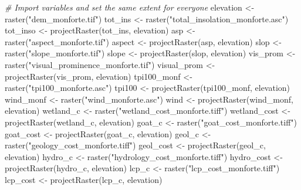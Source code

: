 \documentclass[
]{article}
\newenvironment{Shaded}{\begin{snugshade}}{\end{snugshade}}
\newcommand{\CommentTok}[1]{\textcolor[rgb]{0.56,0.35,0.01}{\textit{#1}}}
\newcommand{\FunctionTok}[1]{\textcolor[rgb]{0.00,0.00,0.00}{#1}}
\newcommand{\NormalTok}[1]{#1}
\newcommand{\OtherTok}[1]{\textcolor[rgb]{0.56,0.35,0.01}{#1}}
\newcommand{\StringTok}[1]{\textcolor[rgb]{0.31,0.60,0.02}{#1}}
\begin{document}
\begin{Shaded}
\begin{Highlighting}[]
\CommentTok{\# Import variables and set the same extent for everyone}
\NormalTok{elevation }\OtherTok{\textless{}{-}} \FunctionTok{raster}\NormalTok{(}\StringTok{"dem\_monforte.tif"}\NormalTok{)}
\NormalTok{tot\_ins }\OtherTok{\textless{}{-}} \FunctionTok{raster}\NormalTok{(}\StringTok{"total\_insolation\_monforte.asc"}\NormalTok{)}
\NormalTok{tot\_inso }\OtherTok{\textless{}{-}} \FunctionTok{projectRaster}\NormalTok{(tot\_ins, elevation)}
\NormalTok{asp }\OtherTok{\textless{}{-}} \FunctionTok{raster}\NormalTok{(}\StringTok{"aspect\_monforte.tif"}\NormalTok{)}
\NormalTok{aspect }\OtherTok{\textless{}{-}} \FunctionTok{projectRaster}\NormalTok{(asp, elevation)}
\NormalTok{slop }\OtherTok{\textless{}{-}} \FunctionTok{raster}\NormalTok{(}\StringTok{"slope\_monforte.tif"}\NormalTok{)}
\NormalTok{slope }\OtherTok{\textless{}{-}} \FunctionTok{projectRaster}\NormalTok{(slop, elevation)}
\NormalTok{vis\_prom }\OtherTok{\textless{}{-}} \FunctionTok{raster}\NormalTok{(}\StringTok{"visual\_prominence\_monforte.tif"}\NormalTok{)}
\NormalTok{visual\_prom }\OtherTok{\textless{}{-}} \FunctionTok{projectRaster}\NormalTok{(vis\_prom, elevation)}
\NormalTok{tpi100\_monf }\OtherTok{\textless{}{-}} \FunctionTok{raster}\NormalTok{(}\StringTok{"tpi100\_monforte.asc"}\NormalTok{)}
\NormalTok{tpi100 }\OtherTok{\textless{}{-}} \FunctionTok{projectRaster}\NormalTok{(tpi100\_monf, elevation)}
\NormalTok{wind\_monf }\OtherTok{\textless{}{-}} \FunctionTok{raster}\NormalTok{(}\StringTok{"wind\_monforte.asc"}\NormalTok{)}
\NormalTok{wind }\OtherTok{\textless{}{-}} \FunctionTok{projectRaster}\NormalTok{(wind\_monf, elevation)}
\NormalTok{wetland\_c }\OtherTok{\textless{}{-}} \FunctionTok{raster}\NormalTok{(}\StringTok{"wetland\_cost\_monforte.tiff"}\NormalTok{)}
\NormalTok{wetland\_cost }\OtherTok{\textless{}{-}} \FunctionTok{projectRaster}\NormalTok{(wetland\_c, elevation)}
\NormalTok{goat\_c }\OtherTok{\textless{}{-}} \FunctionTok{raster}\NormalTok{(}\StringTok{"goat\_cost\_monforte.tiff"}\NormalTok{)}
\NormalTok{goat\_cost }\OtherTok{\textless{}{-}} \FunctionTok{projectRaster}\NormalTok{(goat\_c, elevation)}
\NormalTok{geol\_c }\OtherTok{\textless{}{-}} \FunctionTok{raster}\NormalTok{(}\StringTok{"geology\_cost\_monforte.tiff"}\NormalTok{)}
\NormalTok{geol\_cost }\OtherTok{\textless{}{-}} \FunctionTok{projectRaster}\NormalTok{(geol\_c, elevation)}
\NormalTok{hydro\_c }\OtherTok{\textless{}{-}} \FunctionTok{raster}\NormalTok{(}\StringTok{"hydrology\_cost\_monforte.tiff"}\NormalTok{)}
\NormalTok{hydro\_cost }\OtherTok{\textless{}{-}} \FunctionTok{projectRaster}\NormalTok{(hydro\_c, elevation)}
\NormalTok{lcp\_c }\OtherTok{\textless{}{-}} \FunctionTok{raster}\NormalTok{(}\StringTok{"lcp\_cost\_monforte.tiff"}\NormalTok{)}
\NormalTok{lcp\_cost }\OtherTok{\textless{}{-}} \FunctionTok{projectRaster}\NormalTok{(lcp\_c, elevation)}
\end{Highlighting}
\end{Shaded}
\end{document}
